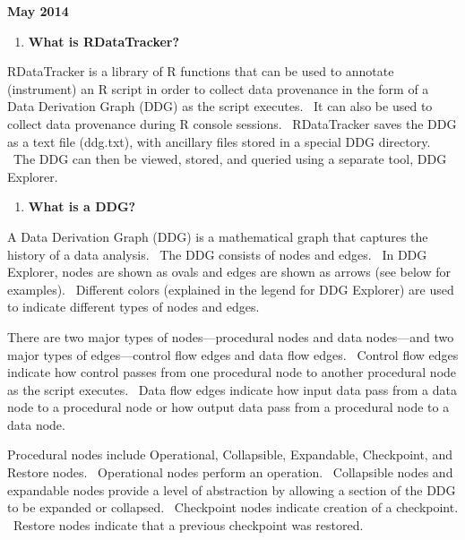 \documentclass[letterpaper]{article}
\newcounter{saveenum}
\newcommand\liststyleWWNumxv{%
\renewcommand\theenumi{\arabic{enumi}}
\renewcommand\theenumii{\alph{enumii}}
\renewcommand\theenumiii{\alph{enumii}.\roman{enumiii}}
\renewcommand\theenumiv{\alph{enumii}.\roman{enumiii}.\arabic{enumiv}}
\renewcommand\labelenumi{\theenumi.}
\renewcommand\labelenumii{\theenumii.}
\renewcommand\labelenumiii{\theenumiii.}
\renewcommand\labelenumiv{\theenumiv.}
}
\begin{document}
{\centering
\textbf{May 2014}
\par}


\bigskip

\liststyleWWNumxv
\begin{enumerate}
\item \textbf{What is RDataTracker?}
\end{enumerate}

\bigskip

RDataTracker is a library of R functions that can be used to annotate (instrument) an R script in order to collect data provenance in the form of a Data Derivation Graph (DDG) as the script executes. \ It can also be used to collect data provenance during R console sessions. \ RDataTracker saves the DDG as a text file (ddg.txt), with ancillary files stored in a special DDG directory. \ The DDG can then be viewed, stored, and queried using a separate tool, DDG Explorer.


\bigskip

\liststyleWWNumxv
\setcounter{saveenum}{\value{enumi}}
\begin{enumerate}
\setcounter{enumi}{\value{saveenum}}
\item \textbf{What is a DDG?}
\end{enumerate}

\bigskip

A Data Derivation Graph (DDG) is a mathematical graph that captures the history of a data analysis. \ The DDG consists of nodes and edges. \ In DDG Explorer, nodes are shown as ovals and edges are shown as arrows (see below for examples). \ Different colors (explained in the legend for DDG Explorer) are used to indicate different types of nodes and edges.


\bigskip

There are two major types of nodes---procedural nodes and data nodes---and two major types of edges---control flow edges and data flow edges. \ Control flow edges indicate how control passes from one procedural node to another procedural node as the script executes. \ Data flow edges indicate how input data pass from a data node to a procedural node or how output data pass from a procedural node to a data node.


\bigskip

Procedural nodes include Operational, Collapsible, Expandable, Checkpoint, and Restore nodes. \ Operational nodes perform an operation. \ Collapsible nodes and expandable nodes provide a level of abstraction by allowing a section of the DDG to be expanded or collapsed. \ Checkpoint nodes indicate creation of a checkpoint. \ Restore nodes indicate that a previous checkpoint was restored.
\end{document}
